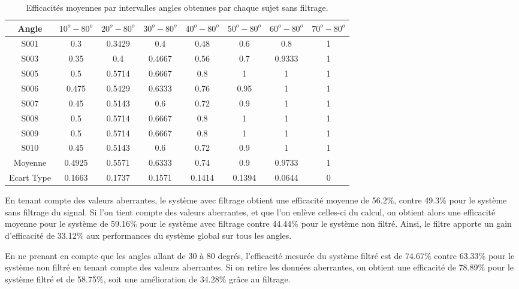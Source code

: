 \documentclass[letterpaper, twoside, 12pt, memoire, creativecommons, hyperref]{thETS}
\begin{document}
\begin{table}[ht]
	\caption{Efficacités moyennes par intervalles angles obtenues par chaque sujet sans filtrage. }
		\begin{tabular}{|c|c|c|c|c|c|c|c|}
		\hline
			Angle & $10^{o}-80^{o}$ & $20^{o}-80^{o}$ & $30^{o}-80^{o}$ & $40^{o}-80^{o}$ & $50^{o}-80^{o}$ & $60^{o}-80^{o}$ & $70^{o}-80^{o}$ \\
	    \hline
	    		S001 & 0.3 & 0.3429 & 0.4 & 0.48 & 0.6 & 0.8 & 1\\
	    \hline
	    		S003 & 0.35 & 0.4 & 0.4667 & 0.56 & 0.7 & 0.9333 & 1\\
	    \hline
	    		S005 & 0.5 & 0.5714 & 0.6667 & 0.8 & 1 & 1 & 1\\
	    \hline
	    		S006 & 0.475 & 0.5429 & 0.6333 & 0.76 & 0.95 & 1 & 1\\
	    \hline
	    		S007 & 0.45 & 0.5143 & 0.6 & 0.72 & 0.9 & 1 & 1\\
	    \hline
	    		S008 & 0.5 & 0.5714 & 0.6667 & 0.8 & 1 & 1 & 1\\
	    \hline
	    		S009 & 0.5 & 0.5714 & 0.6667 & 0.8 & 1 & 1 & 1\\
	    \hline
	    		S010 & 0.45 & 0.5143 & 0.6 & 0.72 & 0.9 & 1 & 1\\
	    \hline
	    		Moyenne  & 0.4925 & 0.5571 & 0.6333 & 0.74 & 0.9 & 0.9733 & 1\\
	    \hline
	    		Ecart Type & 0.1663 & 0.1737 & 0.1571 & 0.1414 & 0.1394 & 0.0644 & 0\\
	    \hline
		\end{tabular}
	\label{tab:effFinterval}
\end{table}

En tenant compte des valeurs aberrantes, le système avec filtrage obtient une efficacité moyenne de 56.2\%, contre 49.3\% pour le système sans filtrage du signal. Si l'on tient compte des valeurs aberrantes, et que l'on enlève celles-ci du calcul, on obtient alors une efficacité moyenne pour le système de 59.16\% pour le système avec filtrage contre 44.44\% pour le système non filtré. Ainsi, le filtre apporte un gain d'efficacité de 33.12\% aux performances du système global sur tous les angles.

En ne prenant en compte que les angles allant de 30 à 80 degrés, l'efficacité mesurée du système filtré est de 74.67\% contre 63.33\% pour le système non filtré en tenant compte des valeurs aberrantes. Si on retire les données aberrantes, on obtient une efficacité de 78.89\% pour le système filtré et de 58.75\%, soit une amélioration de 34.28\% grâce au filtrage.
\end{document}
